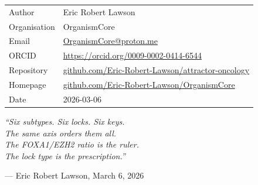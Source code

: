 \documentclass[12pt, a4paper]{article}
\begin{document}
\begin{tabular}{ll}
Author        & Eric Robert Lawson \\
Organisation  & OrganismCore \\
Email         &
  \href{mailto:OrganismCore@proton.me}
       {OrganismCore@proton.me} \\
ORCID         &
  \href{https://orcid.org/0009-0002-0414-6544}
       {https://orcid.org/0009-0002-0414-6544} \\
Repository    &
  \href{https://github.com/Eric-Robert-Lawson/attractor-oncology}
       {github.com/Eric-Robert-Lawson/attractor-oncology} \\
Homepage      &
  \href{https://github.com/Eric-Robert-Lawson/OrganismCore}
       {github.com/Eric-Robert-Lawson/OrganismCore} \\
Date          & 2026-03-06 \\
\end{tabular}

\vspace{2em}

\begin{center}
\itshape
``Six subtypes. Six locks. Six keys.\\
The same axis orders them all.\\
The FOXA1/EZH2 ratio is the ruler.\\
The lock type is the prescription.''

\medskip
\upshape
--- Eric Robert Lawson, March 6, 2026
\end{center}

\end{document}
